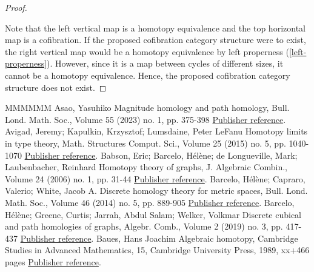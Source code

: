 \documentclass[11pt]{article}
\theoremstyle{definition}
\numberwithin{equation}{section}
\begin{document}
\begin{proof}
\begin{figure}[H]
\end{figure}
Note that the left vertical map is a homotopy equivalence and the top horizontal map is a cofibration.
If the proposed cofibration category structure were to exist, the right vertical map would be a homotopy equivalence by left properness (\cref{left-properness}).
However, since it is a map between cycles of different sizes, it cannot be a homotopy equivalence.
Hence, the proposed cofibration category structure does not exist.
\end{proof}
\begin{thebibliography}{MMMMMM}
 Asao, Yasuhiko Magnitude homology and path homology, Bull. Lond. Math. Soc., Volume 55 (2023) no. 1, pp. 375-398 \href{https://alco.centre-mersenne.org/articles/10.5802/alco.341/#asao:magnitude-n-path}{Publisher reference}.
 Avigad, Jeremy; Kapulkin, Krzysztof; Lumsdaine, Peter LeFanu Homotopy limits in type theory, Math. Structures Comput. Sci., Volume 25 (2015) no. 5, pp. 1040-1070 \href{https://alco.centre-mersenne.org/articles/10.5802/alco.341/#avigad-kapulkin-lumsdaine}{Publisher reference}.
 Babson, Eric; Barcelo, Hélène; de Longueville, Mark; Laubenbacher, Reinhard Homotopy theory of graphs, J. Algebraic Combin., Volume 24 (2006) no. 1, pp. 31-44 \href{https://alco.centre-mersenne.org/articles/10.5802/alco.341/#babson-barcelo-longueville-laubenbacher}{Publisher reference}.
 Barcelo, Hélène; Capraro, Valerio; White, Jacob A. Discrete homology theory for metric spaces, Bull. Lond. Math. Soc., Volume 46 (2014) no. 5, pp. 889-905 \href{https://alco.centre-mersenne.org/articles/10.5802/alco.341/#barcelo-capraro-white}{Publisher reference}.
 Barcelo, Hélène; Greene, Curtis; Jarrah, Abdul Salam; Welker, Volkmar Discrete cubical and path homologies of graphs, Algebr. Comb., Volume 2 (2019) no. 3, pp. 417-437 \href{https://alco.centre-mersenne.org/articles/10.5802/alco.341/#barcelo-greene-jarraj-welker:discrete-path}{Publisher reference}.
 Baues, Hans Joachim Algebraic homotopy, Cambridge Studies in Advanced Mathematics, 15, Cambridge University Press, 1989, xx+466 pages \href{https://alco.centre-mersenne.org/articles/10.5802/alco.341/#baues:algebraic-homotopy}{Publisher reference}.

\end{thebibliography}
\end{document}
